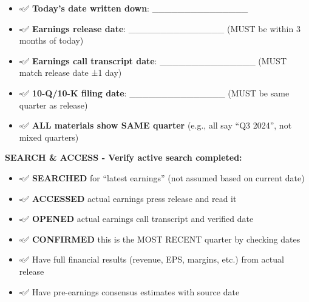 \documentclass[11pt]{article}
\newcommand{\UncheckedBox}{$\square$}
\begin{document}
\begin{itemize}[leftmargin=*,itemsep=2pt,topsep=2pt]
\item {} \UncheckedBox ✅ \textbf{Today's date written down}: \_\allowbreak{}\_\allowbreak{}\_\allowbreak{}\_\allowbreak{}\_\allowbreak{}\_\allowbreak{}\_\allowbreak{}\_\allowbreak{}\_\allowbreak{}\_\allowbreak{}\_\allowbreak{}\_\allowbreak{}\_\allowbreak{}\_\allowbreak{}\_\allowbreak{}
\item {} \UncheckedBox ✅ \textbf{Earnings release date}: \_\allowbreak{}\_\allowbreak{}\_\allowbreak{}\_\allowbreak{}\_\allowbreak{}\_\allowbreak{}\_\allowbreak{}\_\allowbreak{}\_\allowbreak{}\_\allowbreak{}\_\allowbreak{}\_\allowbreak{}\_\allowbreak{}\_\allowbreak{}\_\allowbreak{} (MUST be within 3 months of today)
\item {} \UncheckedBox ✅ \textbf{Earnings call transcript date}: \_\allowbreak{}\_\allowbreak{}\_\allowbreak{}\_\allowbreak{}\_\allowbreak{}\_\allowbreak{}\_\allowbreak{}\_\allowbreak{}\_\allowbreak{}\_\allowbreak{}\_\allowbreak{}\_\allowbreak{}\_\allowbreak{}\_\allowbreak{}\_\allowbreak{} (MUST match release date ±1 day)
\item {} \UncheckedBox ✅ \textbf{10-Q/10-K filing date}: \_\allowbreak{}\_\allowbreak{}\_\allowbreak{}\_\allowbreak{}\_\allowbreak{}\_\allowbreak{}\_\allowbreak{}\_\allowbreak{}\_\allowbreak{}\_\allowbreak{}\_\allowbreak{}\_\allowbreak{}\_\allowbreak{}\_\allowbreak{}\_\allowbreak{} (MUST be same quarter as release)
\item {} \UncheckedBox ✅ \textbf{ALL materials show SAME quarter} (e.g., all say ``Q3 2024'', not mixed quarters)
\end{itemize}

\textbf{SEARCH \& ACCESS - Verify active search completed:}

\begin{itemize}[leftmargin=*,itemsep=2pt,topsep=2pt]
\item {} \UncheckedBox ✅ \textbf{SEARCHED} for ``latest earnings'' (not assumed based on current date)
\item {} \UncheckedBox ✅ \textbf{ACCESSED} actual earnings press release and read it
\item {} \UncheckedBox ✅ \textbf{OPENED} actual earnings call transcript and verified date
\item {} \UncheckedBox ✅ \textbf{CONFIRMED} this is the MOST RECENT quarter by checking dates
\item {} \UncheckedBox ✅ Have full financial results (revenue, EPS, margins, etc.) from actual release
\item {} \UncheckedBox ✅ Have pre-earnings consensus estimates with source date
\end{itemize}
\end{document}
